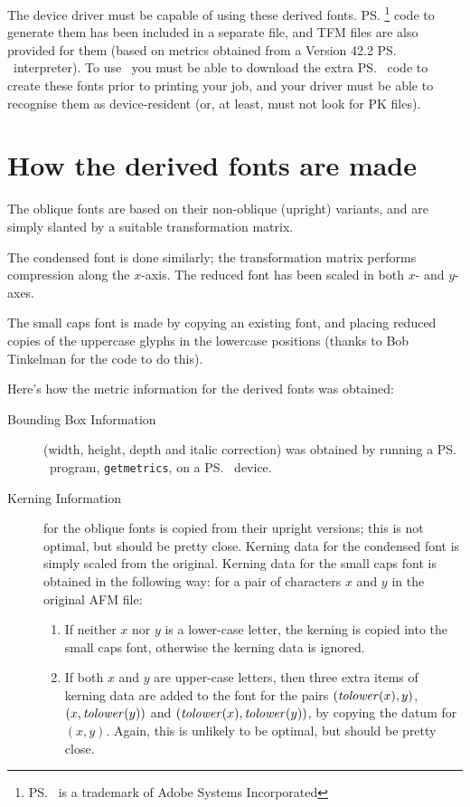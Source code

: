 The device driver must be capable of using these derived fonts.
\ps\footnote{\ps\ is a trademark of Adobe Systems Incorporated}
code to generate them has been included in a separate file, and TFM
files are also provided for them (based on metrics obtained from a
Version 42.2 \ps\ interpreter).  To use \pslatex\ you must be able to
download the extra \ps\ code to create these fonts prior to printing your
job, and your driver must be able to recognise them as device-resident
(or, at least, must not look for PK files).

\section{How the derived fonts are made}

The oblique fonts are based on their non-oblique (upright) variants,
and are simply slanted by a suitable transformation matrix.

The condensed font is done similarly; the transformation matrix
performs compression along the $x$-axis.  The reduced font has
been scaled in both $x$- and $y$-axes.

The small caps font is made by copying an existing font, and placing
reduced copies of the uppercase glyphs in the lowercase positions
(thanks to Bob Tinkelman for the code to do this).

Here's how the metric information for the derived fonts was obtained:
\begin{description}
\item[Bounding Box Information]
	(width, height, depth and italic correction) was obtained by
	running a \ps\ program, {\tt getmetrics}, on a \ps\ device.
\item[Kerning Information]
	for the oblique fonts is copied from their upright versions;
	this is not optimal, but should be pretty close.  Kerning data
	for the condensed font is simply scaled from the original.
	Kerning data for the small caps font is obtained in the
	following way: for a pair of characters $x$ and $y$ in the
	original AFM file:
	\begin{enumerate}
	\item	If neither $x$ nor $y$ is a lower-case letter, the
		kerning is copied into the small caps font, otherwise
		the kerning data is ignored.
	\item	If both $x$ and $y$ are upper-case letters, then
		three extra items of kerning data are added to the
		font for the pairs $(\mbox{\it tolower\/}(x),y)$,
		$(x,\mbox{\it tolower\/}(y))$ and $(\mbox{\it
		tolower\/}(x), \mbox{\it tolower\/}(y))$, by copying the
		datum for $(x,y)$.  Again, this is unlikely to be
		optimal, but should be pretty close.
	\end{enumerate}
\end{description}

